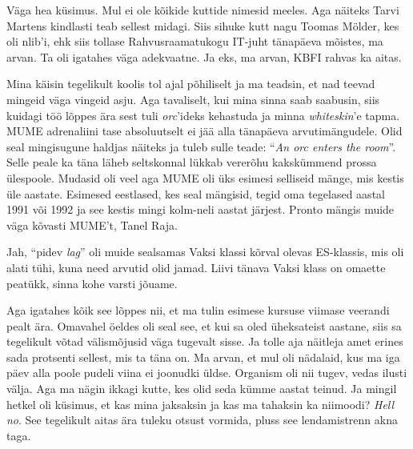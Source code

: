 
Väga hea küsimus. Mul ei ole kõikide kuttide nimesid meeles. Aga näiteks Tarvi 
Martens kindlasti teab sellest midagi. Siis sihuke 
kutt nagu Toomas Mölder, kes oli nlib'i, ehk siis 
tollase Rahvusraamatukogu IT-juht  tänapäeva mõistes, ma arvan. Ta oli igatahes 
väga adekvaatne. Ja eks, ma arvan, KBFI rahvas ka aitas.


Mina käisin tegelikult koolis tol ajal põhiliselt ja ma teadsin, et nad teevad 
mingeid väga vingeid asju. Aga tavaliselt, kui mina sinna saab saabusin, siis 
kuidagi töö lõppes ära sest tuli \emph{orc}'ideks kehastuda ja minna 
\emph{whiteskin}'e tapma. MUME  adrenaliini tase absoluutselt ei jää alla 
tänapäeva arvutimängudele. Olid seal mingisugune haldjas näiteks ja tuleb sulle 
teade: \enquote{\emph{An orc enters the room}}. Selle peale ka täna läheb  
seltskonnal  lükkab vererõhu kakskümmend prossa ülespoole. Mudasid oli veel aga 
MUME oli üks esimesi selliseid mänge, mis kestis üle aastate. Esimesed 
eestlased, kes seal mängisid, tegid oma tegelased aastal 1991 või 1992 ja see 
kestis mingi kolm-neli aastat järjest. Pronto mängis muide 
väga kõvasti MUME't, Tanel Raja. 


Jah, \enquote{pidev \emph{lag}} oli muide sealsamas Vaksi klassi kõrval olevas 
ES-klassis, mis oli alati tühi, kuna need arvutid olid jamad. Liivi tänava 
Vaksi klass on omaette peatükk, sinna kohe varsti jõuame.

Aga igatahes kõik see lõppes nii, et ma tulin esimese kursuse viimase veerandi 
pealt ära. Omavahel öeldes oli seal see, et kui sa oled üheksateist aastane, 
siis sa tegelikult võtad välismõjusid väga tugevalt sisse. Ja tolle aja  
näitleja amet erines sada protsenti sellest, mis ta täna on. Ma arvan, et  mul 
oli nädalaid, kus ma iga päev alla poole pudeli viina ei joonudki üldse. 
Organism oli nii tugev, vedas ilusti välja. Aga ma nägin ikkagi kutte, kes olid 
seda kümme aastat teinud. Ja mingil hetkel oli küsimus, et kas mina jaksaksin 
ja kas ma tahaksin ka niimoodi? \emph{Hell no}. See tegelikult  aitas ära 
tuleku otsust vormida, pluss see lendamistrenn akna taga. 

